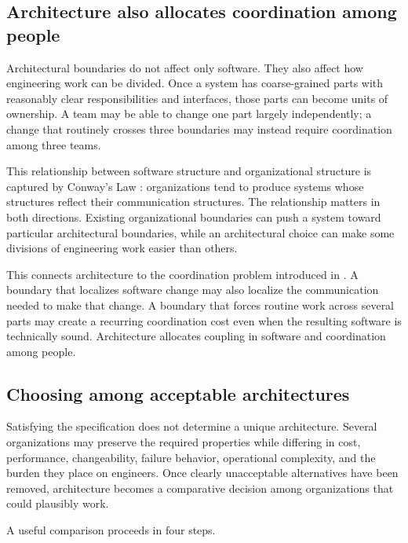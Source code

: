 \subsection{Architecture also allocates coordination among people}\label{sec-coordination}

Architectural boundaries do not affect only software. They also affect how engineering work can be
divided. Once a system has coarse-grained parts with reasonably clear responsibilities and
interfaces, those parts can become units of ownership. A team may be able to change one part
largely independently; a change that routinely crosses three boundaries may instead require
coordination among three teams.

This relationship between software structure and organizational structure is captured by Conway's
Law \citep{conway1968}: organizations tend to produce systems whose structures reflect their
communication structures. The relationship matters in both directions. Existing organizational
boundaries can push a system toward particular architectural boundaries, while an architectural
choice can make some divisions of engineering work easier than others.

This connects architecture to the coordination problem introduced in \citet{ch-teamwork}. A boundary that
localizes software change may also localize the communication needed to make that change. A
boundary that forces routine work across several parts may create a recurring coordination cost
even when the resulting software is technically sound. Architecture allocates coupling in software
and coordination among people.

\subsection{Choosing among acceptable architectures}\label{sec-choosing}

Satisfying the specification does not determine a unique architecture.
Several organizations may preserve the required properties while differing in cost, performance, changeability, failure behavior, operational complexity, and the burden they place on engineers.
Once clearly unacceptable alternatives have been removed, architecture becomes a comparative decision among organizations that could plausibly work.

A useful comparison proceeds in four steps.

